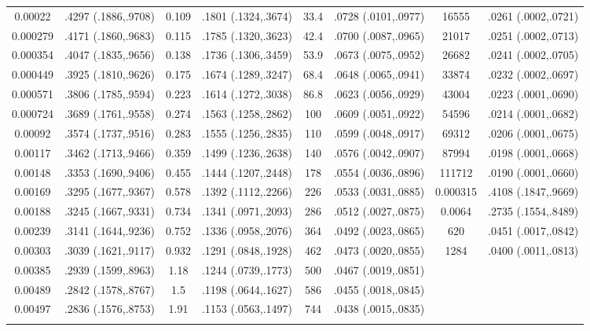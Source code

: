 \begin{longtable}{cccccccc}
  0.00022 & .4297 (.1886,.9708) & 0.109 & .1801 (.1324,.3674) & 33.4 & .0728 (.0101,.0977) & 16555 & .0261 (.0002,.0721) \\ 
  0.000279 & .4171 (.1860,.9683) & 0.115 & .1785 (.1320,.3623) & 42.4 & .0700 (.0087,.0965) & 21017 & .0251 (.0002,.0713) \\ 
  0.000354 & .4047 (.1835,.9656) & 0.138 & .1736 (.1306,.3459) & 53.9 & .0673 (.0075,.0952) & 26682 & .0241 (.0002,.0705) \\ 
  0.000449 & .3925 (.1810,.9626) & 0.175 & .1674 (.1289,.3247) & 68.4 & .0648 (.0065,.0941) & 33874 & .0232 (.0002,.0697) \\ 
  0.000571 & .3806 (.1785,.9594) & 0.223 & .1614 (.1272,.3038) & 86.8 & .0623 (.0056,.0929) & 43004 & .0223 (.0001,.0690) \\ 
  0.000724 & .3689 (.1761,.9558) & 0.274 & .1563 (.1258,.2862) & 100 & .0609 (.0051,.0922) & 54596 & .0214 (.0001,.0682) \\ 
  0.00092 & .3574 (.1737,.9516) & 0.283 & .1555 (.1256,.2835) & 110 & .0599 (.0048,.0917) & 69312 & .0206 (.0001,.0675) \\ 
  0.00117 & .3462 (.1713,.9466) & 0.359 & .1499 (.1236,.2638) & 140 & .0576 (.0042,.0907) & 87994 & .0198 (.0001,.0668) \\ 
  0.00148 & .3353 (.1690,.9406) & 0.455 & .1444 (.1207,.2448) & 178 & .0554 (.0036,.0896) & 111712 & .0190 (.0001,.0660) \\ 
  0.00169 & .3295 (.1677,.9367) & 0.578 & .1392 (.1112,.2266) & 226 & .0533 (.0031,.0885) & 0.000315 & .4108 (.1847,.9669) \\ 
  0.00188 & .3245 (.1667,.9331) & 0.734 & .1341 (.0971,.2093) & 286 & .0512 (.0027,.0875) & 0.0064 & .2735 (.1554,.8489) \\ 
  0.00239 & .3141 (.1644,.9236) & 0.752 & .1336 (.0958,.2076) & 364 & .0492 (.0023,.0865) & 620 & .0451 (.0017,.0842) \\ 
  0.00303 & .3039 (.1621,.9117) & 0.932 & .1291 (.0848,.1928) & 462 & .0473 (.0020,.0855) & 1284 & .0400 (.0011,.0813) \\ 
  0.00385 & .2939 (.1599,.8963) & 1.18 & .1244 (.0739,.1773) & 500 & .0467 (.0019,.0851) &  &  \\ 
  0.00489 & .2842 (.1578,.8767) & 1.5 & .1198 (.0644,.1627) & 586 & .0455 (.0018,.0845) &  &  \\ 
  0.00497 & .2836 (.1576,.8753) & 1.91 & .1153 (.0563,.1497) & 744 & .0438 (.0015,.0835) &  &  \\ 
   \hline
\hline
\label{tab marginalized_risks_eq 2}
\end{longtable}
